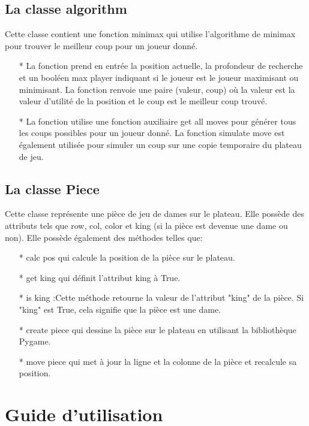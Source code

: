 \documentclass[12pt]{article}
\begin{document}
	 \subsection{La classe algorithm}
	 Cette classe contient une fonction minimax qui utilise l'algorithme de minimax pour trouver le meilleur coup pour un joueur donné.
	 \begin{itemize}
	 	\item[* ] La fonction prend en entrée la position actuelle, la profondeur de recherche et un booléen max player indiquant si le joueur est le joueur maximisant ou minimisant. La fonction renvoie une paire (valeur, coup) où la valeur est la valeur d'utilité de la position et le coup est le meilleur coup trouvé.
	 	\item[* ] La fonction utilise une fonction auxiliaire get all moves pour générer tous les coups possibles pour un joueur donné. La fonction simulate move est également utilisée pour simuler un coup sur une copie temporaire du plateau de jeu.
	 \end{itemize}
	  
	 
	 \subsection{La classe Piece}
	  Cette classe représente une pièce de jeu de dames sur le plateau. Elle possède des attributs tels que row, col, color et king (si la pièce est devenue une dame ou non). Elle possède également des méthodes telles que:
	 \begin{itemize}
	 	\item[* ] calc pos qui calcule la position de la pièce sur le plateau.
	 	\item[* ] get king qui définit l'attribut king à True.
	 	\item[* ] is king :Cette méthode retourne la valeur de l'attribut "king" de la pièce. Si "king" est True, cela signifie que la pièce est une dame.
	 	\item[* ] create piece qui dessine la pièce sur le plateau en utilisant la bibliothèque Pygame.
	 	\item[* ] move piece qui met à jour la ligne et la colonne de la pièce et recalcule sa position.
	 \end{itemize}
	 
	 
	
	 \section{Guide d'utilisation}
	 	
\end{document}
